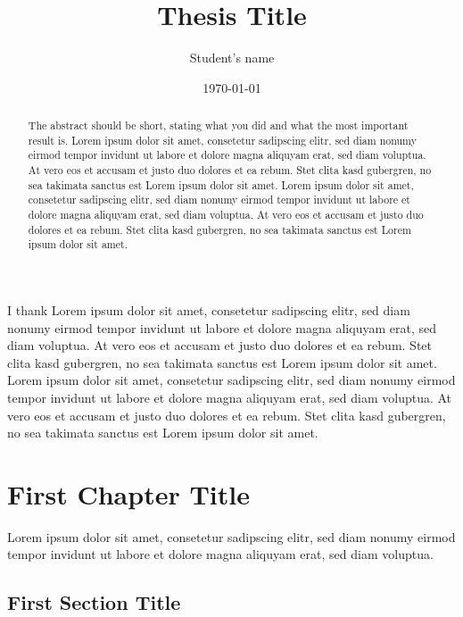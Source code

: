 \documentclass[a4paper, oneside]{author_kit_thesis/discothesis}
\title{Thesis Title}
\author{Student's name}
\institute{Distributed Computing Group \\[2pt]
Computer Engineering and Networks Laboratory \\[2pt]
ETH Zürich}
\date{\today}
\begin{document}
\frontmatter %
\maketitle

\cleardoublepage

\begin{acknowledgements}
	I thank Lorem ipsum dolor sit amet, consetetur sadipscing elitr, sed diam nonumy eirmod tempor invidunt ut labore et dolore magna aliquyam erat, sed diam voluptua. At vero eos et accusam et justo duo dolores et ea rebum. Stet clita kasd gubergren, no sea takimata sanctus est Lorem ipsum dolor sit amet. Lorem ipsum dolor sit amet, consetetur sadipscing elitr, sed diam nonumy eirmod tempor invidunt ut labore et dolore magna aliquyam erat, sed diam voluptua. At vero eos et accusam et justo duo dolores et ea rebum. Stet clita kasd gubergren, no sea takimata sanctus est Lorem ipsum dolor sit amet.
\end{acknowledgements}


\begin{abstract}
    The abstract should be short, stating what you did and what the most important result is.
	Lorem ipsum dolor sit amet, consetetur sadipscing elitr, sed diam nonumy eirmod tempor invidunt ut labore et dolore magna aliquyam erat, sed diam voluptua. At vero eos et accusam et justo duo dolores et ea rebum. Stet clita kasd gubergren, no sea takimata sanctus est Lorem ipsum dolor sit amet. Lorem ipsum dolor sit amet, consetetur sadipscing elitr, sed diam nonumy eirmod tempor invidunt ut labore et dolore magna aliquyam erat, sed diam voluptua. At vero eos et accusam et justo duo dolores et ea rebum. Stet clita kasd gubergren, no sea takimata sanctus est Lorem ipsum dolor sit amet.
\end{abstract}

\tableofcontents

\mainmatter %

\chapter{First Chapter Title}

Lorem ipsum dolor sit amet, consetetur sadipscing elitr, sed diam nonumy eirmod tempor invidunt ut labore et dolore magna aliquyam erat, sed diam voluptua.

\section{First Section Title}
\end{document}
